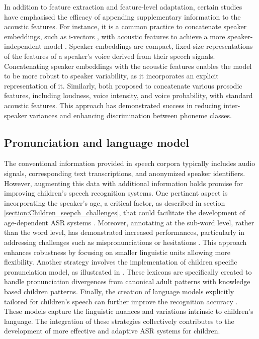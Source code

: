 In addition to feature extraction and feature-level adaptation, certain studies have emphasised the efficacy of appending supplementary information to the acoustic features. For instance, it is a common practice to concatenate speaker embeddings, such as i-vectors \cite{ivector}, with acoustic features to achieve a more speaker-independent model \cite{shivakumar2020transfer}. Speaker embeddings are compact, fixed-size representations of the features of a speaker's voice derived from their speech signals. Concatenating speaker embeddings with the acoustic features enables the model to be more robust to speaker variability, as it incorporates an explicit representation of it. Similarly, both \cite{prosody_feat,kadyan2023prosody} proposed to  concatenate various prosodic features, including loudness, voice intensity, and voice probability, with standard acoustic features. This approach has demonstrated success in reducing inter-speaker variances and enhancing discrimination between phoneme classes.


\subsection{Pronunciation and language model}
The conventional information provided in speech corpora typically includes audio signals, corresponding text transcriptions, and anonymized speaker identifiers. However, augmenting this data with additional information holds promise for improving children's speech recognition systems. One pertinent aspect is incorporating the speaker's age, a critical factor, as described in section \ref{section:Children_seepch_challenges}, that could facilitate the development of age-dependent \ac{ASR} systems \cite{linguistic-children, gale2019improving}. 
Moreover, annotating at the sub-word level, rather than the word level, has demonstrated increased performances, particularly in addressing challenges such as mispronunciations or hesitations \cite{subwords}. This approach enhances robustness by focusing on smaller linguistic units allowing more flexibility. Another strategy involves the implementation of children specific pronunciation model, as illustrated in \cite{pronunciation,pronunciation2}. These lexicons are specifically created to handle pronunciation divergences from canonical adult patterns with knowledge based children patterns.
Finally, the creation of language models explicitly tailored for children's speech can further improve the recognition accuracy \cite{children_language_model2,Children_language_model}. These models capture the linguistic nuances and variations intrinsic to children's language. The integration of these strategies collectively contributes to the development of more effective and adaptive \ac{ASR} systems for children.

